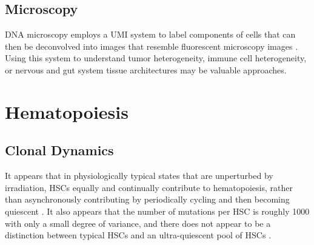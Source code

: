 \documentclass[]{book}
\begin{document}
\hypertarget{microscopy}{%
\section{Microscopy}\label{microscopy}}

DNA microscopy employs a UMI system to label components of cells that can then be deconvolved into images that resemble fluorescent microscopy images \citep{weinstein2019dna}. Using this system to understand tumor heterogeneity, immune cell heterogeneity, or nervous and gut system tissue architectures may be valuable approaches.

\hypertarget{hematopoiesis}{%
\chapter{Hematopoiesis}\label{hematopoiesis}}

\hypertarget{clonal-dynamics}{%
\section{Clonal Dynamics}\label{clonal-dynamics}}

It appears that in physiologically typical states that are unperturbed by irradiation, HSCs equally and continually contribute to hematopoiesis, rather than asynchronously contributing by periodically cycling and then becoming quiescent \citep{lu2019clonal}. It also appears that the number of mutations per HSC is roughly 1000 with only a small degree of variance, and there does not appear to be a distinction between typical HSCs and an ultra-quiescent pool of HSCs \citep{lee2018population}.


\end{document}
